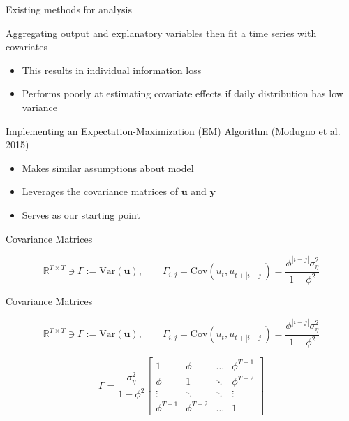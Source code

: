 \documentclass[9pt]{beamer}
\numberwithin{equation}{section}
\theoremstyle{plain}
\newcommand{\uu}{\mathbf{u}}
\begin{document}
\begin{frame}{Existing methods for analysis}

\begin{block}{Aggregating output and explanatory variables then fit a time series with covariates}
\begin{itemize}
    \item This results in individual information loss
    \item Performs poorly at estimating covariate effects if daily distribution has low variance
\end{itemize}
\end{block}
\begin{block}{Implementing an Expectation-Maximization (EM) Algorithm (Modugno et al. 2015)}
\begin{itemize}
    \item Makes similar assumptions about model
    \item Leverages the covariance matrices of $\mathbf{u}$ and $\mathbf{y}$
    \item Serves as our starting point
\end{itemize}
    
\end{block}

\end{frame}

\begin{frame}[t]{Covariance Matrices}
    \begin{block}
        \centering
        $$    \mathbb{R}^{T\times T} \ni\Gamma := \text{Var}(\uu), \qquad \Gamma_{i,j} = \text{Cov}(u_t,u_{t+|i-j|}) = \frac{\phi^{|i-j|}\sigma_\eta^2}{1-\phi^2}$$
    \end{block}
\end{frame}

\begin{frame}[t]{Covariance Matrices}
    \begin{block}
        \centering
        $$    \mathbb{R}^{T\times T} \ni\Gamma := \text{Var}(\uu), \qquad \Gamma_{i,j} = \text{Cov}(u_t,u_{t+|i-j|}) = \frac{\phi^{|i-j|}\sigma_\eta^2}{1-\phi^2}$$
    \end{block}

    \begin{block}
        \centering
        $$\Gamma = \frac{\sigma_\eta^2}{1-\phi^2}\left[\begin{array}{cccc}
        1 &\phi & \dots & \phi^{T-1} \\
       \phi &  1  & \ddots & \phi^{T-2}\\
       \vdots & \ddots & \ddots & \vdots \\
       \phi^{T-1} & \phi^{T-2} & \dots & 1
    \end{array}\right]$$
    \end{block}

\end{frame}
\end{document}
